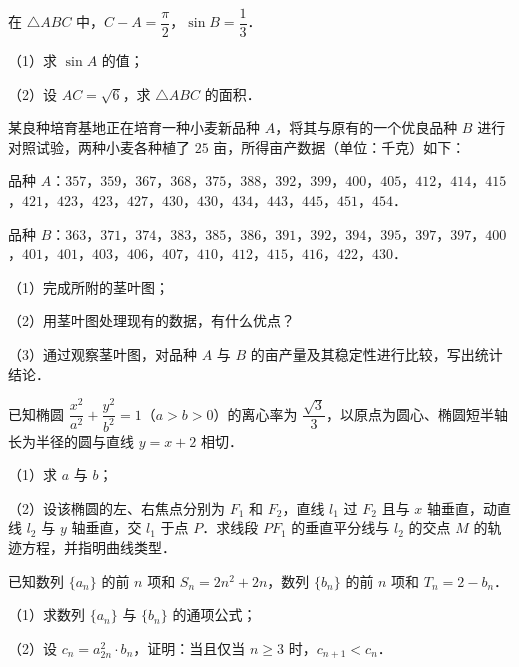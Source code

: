 \begin{question}
在 $\triangle ABC$ 中，$C-A=\dfrac{\pi}{2}$，$\sin B=\dfrac13$．

（1）求 $\sin A$ 的值；

（2）设 $AC=\sqrt6$，求 $\triangle ABC$ 的面积．

\Needspace{0.4\textheight}
\end{question}
\begin{question}
某良种培育基地正在培育一种小麦新品种 $A$，将其与原有的一个优良品种 $B$ 进行对照试验，两种小麦各种植了 $25$ 亩，所得亩产数据（单位：千克）如下：

品种 $A$：$357$，$359$，$367$，$368$，$375$，$388$，$392$，$399$，$400$，$405$，$412$，$414$，$415$，$421$，$423$，$423$，$427$，$430$，$430$，$434$，$443$，$445$，$451$，$454$．

品种 $B$：$363$，$371$，$374$，$383$，$385$，$386$，$391$，$392$，$394$，$395$，$397$，$397$，$400$，$401$，$401$，$403$，$406$，$407$，$410$，$412$，$415$，$416$，$422$，$430$．

（1）完成所附的茎叶图；

（2）用茎叶图处理现有的数据，有什么优点？

（3）通过观察茎叶图，对品种 $A$ 与 $B$ 的亩产量及其稳定性进行比较，写出统计结论．
\nopagebreak[4]
\begin{center}\end{center}
\nopagebreak[4]
\end{question}
\begin{question}
已知椭圆 $\dfrac{x^2}{a^2}+\dfrac{y^2}{b^2}=1$（$a>b>0$）的离心率为 $\dfrac{\sqrt3}{3}$，以原点为圆心、椭圆短半轴长为半径的圆与直线 $y=x+2$ 相切．

（1）求 $a$ 与 $b$；

（2）设该椭圆的左、右焦点分别为 $F_1$ 和 $F_2$，直线 $l_1$ 过 $F_2$ 且与 $x$ 轴垂直，动直线 $l_2$ 与 $y$ 轴垂直，交 $l_1$ 于点 $P$．求线段 $PF_1$ 的垂直平分线与 $l_2$ 的交点 $M$ 的轨迹方程，并指明曲线类型．

\end{question}
\begin{question}
已知数列 $\{a_n\}$ 的前 $n$ 项和 $S_n=2n^2+2n$，数列 $\{b_n\}$ 的前 $n$ 项和 $T_n=2-b_n$．

（1）求数列 $\{a_n\}$ 与 $\{b_n\}$ 的通项公式；

（2）设 $c_n=a_{2n}^2\cdot b_n$，证明：当且仅当 $n\geqslant3$ 时，$c_{n+1}<c_n$．

\Needspace{0.4\textheight}
\end{question}
